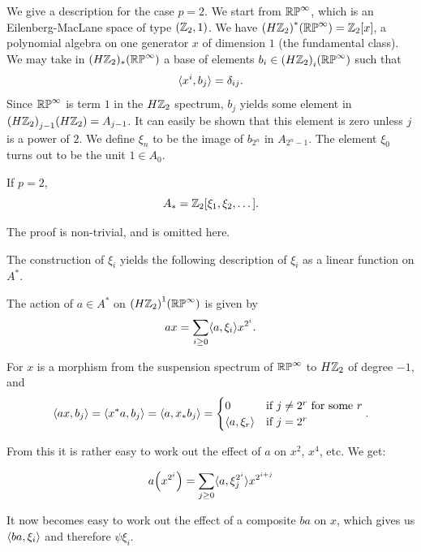 \documentclass[../main]{subfiles}
\begin{document}
We give a description for the case $p=2$. We start from $\mathbb{RP}^\infty$, which is an Eilenberg-MacLane space of type $(\mathbb{Z}_2,1)$. We have ${(H\mathbb{Z}_2)}^\ast(\mathbb{RP}^\infty)=\mathbb{Z}_2[x]$, a polynomial algebra on one generator $x$ of dimension $1$ (the fundamental class). We may take in $(H\mathbb{Z}_2)_\ast(\mathbb{RP}^\infty)$ a base of elements $b_i\in{(H\mathbb{Z}_2)}_i(\mathbb{RP}^\infty)$ such that
\[ \langle x^i, b_j\rangle = \delta_{ij} . \]
Since $\mathbb{RP}^\infty$ is term $1$ in the $H\mathbb{Z}_2$ spectrum, $b_j$ yields some element in \newline ${(H\mathbb{Z}_2)}_{j-1}(H\mathbb{Z}_2)=A_{j-1}$. It can easily be shown that this element is zero unless $j$ is a power of $2$. We define $\xi_n$ to be the image of $b_{2^n}$ in $A_{2^n-1}$. The element $\xi_0$ turns out to be the unit $1\in A_0$.

\begin{theorem} \label{thm:p3ch12.1}
If $p=2$,
\[ A_\ast=\mathbb{Z}_2[\xi_1,\xi_2,\dots] . \]
\end{theorem}

The proof is non-trivial, and is omitted here.

The construction of $\xi_i$ yields the following description of $\xi_i$ as a linear function on $A^\ast$.

\begin{proposition} \label{prop:p3ch12.2}
The action of $a\in A^\ast$ on ${(H\mathbb{Z}_2)}^1(\mathbb{RP}^\infty)$ is given by
\[ ax = \sum_{i\geq0}\langle a,\xi_i\rangle x^{2^i} . \]

\end{proposition}

For $x$ is a morphism from the suspension spectrum of $\mathbb{RP}^\infty$ to $H\mathbb{Z}_2$ of degree $-1$, and
\[ \langle ax,b_j\rangle = \langle x^\ast a,b_j\rangle = \langle a,x_\ast b_j\rangle = \begin{cases} 0 & \text{if $j\neq 2^r$ for some $r$} \\ \langle a,\xi_r\rangle & \text{if } j=2^r \end{cases} . \]

From this it is rather easy to work out the effect of $a$ on $x^2$, $x^4$, etc. We get:

\begin{proposition} \label{prop:p3ch12.3}
\[ a\Big(x^{2^i}\Big) = \sum_{j\geq0}\langle a,\xi_j^{2^i}\rangle x^{2^{i+j}} \]
\end{proposition}

It now becomes easy to work out the effect of a composite $ba$ on $x$, which gives us $\langle ba,\xi_i\rangle$ and therefore $\psi\xi_i$.
\end{document}
